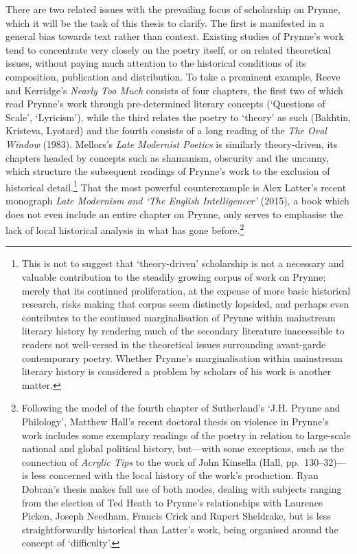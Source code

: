 \documentclass[]{article}
\begin{document}
There are two related issues with the prevailing focus of scholarship on
Prynne, which it will be the task of this thesis to clarify. The first
is manifested in a general bias towards text rather than context.
Existing studies of Prynne’s work tend to concentrate very closely on
the poetry itself, or on related theoretical issues, without paying much
attention to the historical conditions of its composition, publication
and distribution. To take a prominent example, Reeve and Kerridge’s
\emph{Nearly Too Much} consists of four chapters, the first two of which
read Prynne’s work through pre-determined literary concepts (‘Questions
of Scale’, ‘Lyricism’), while the third relates the poetry to ‘theory’
as such (Bakhtin, Kristeva, Lyotard) and the fourth consists of a long
reading of the \emph{The Oval Window} (1983). Mellors’s \emph{Late
Modernist Poetics} is similarly theory-driven, its chapters headed by
concepts such as shamanism, obscurity and the uncanny, which structure
the subsequent readings of Prynne’s work to the exclusion of historical
detail.\footnote{This is not to suggest that ‘theory-driven’ scholarship
  is not a necessary and valuable contribution to the steadily growing
  corpus of work on Prynne; merely that its continued proliferation, at
  the expense of more basic historical research, risks making that
  corpus seem distinctly lopsided, and perhaps even contributes to the
  continued marginalisation of Prynne within mainstream literary history
  by rendering much of the secondary literature inaccessible to readers
  not well-versed in the theoretical issues surrounding avant-garde
  contemporary poetry. Whether Prynne’s marginalisation within
  mainstream literary history is considered a problem by scholars of his
  work is another matter.} That the most powerful counterexample is Alex
Latter’s recent monograph \emph{Late Modernism and ‘The English
Intelligencer’} (2015), a book which does not even include an entire
chapter on Prynne, only serves to emphasise the lack of local historical
analysis in what has gone before.\footnote{Following the model of the
  fourth chapter of Sutherland’s ‘J.H. Prynne and Philology’, Matthew
  Hall’s recent doctoral thesis on violence in Prynne’s work includes
  some exemplary readings of the poetry in relation to large-scale
  national and global political history, but—with some exceptions, such
  as the connection of \emph{Acrylic Tips} to the work of John Kinsella
  (Hall, pp.~130–32)—is less concerned with the local history of the
  work’s production. Ryan Dobran’s thesis makes full use of both modes,
  dealing with subjects ranging from the election of Ted Heath to
  Prynne’s relationships with Laurence Picken, Joseph Needham, Francis
  Crick and Rupert Sheldrake, but is less straightforwardly historical
  than Latter’s work, being organised around the concept of
  ‘difficulty’.}
\end{document}
